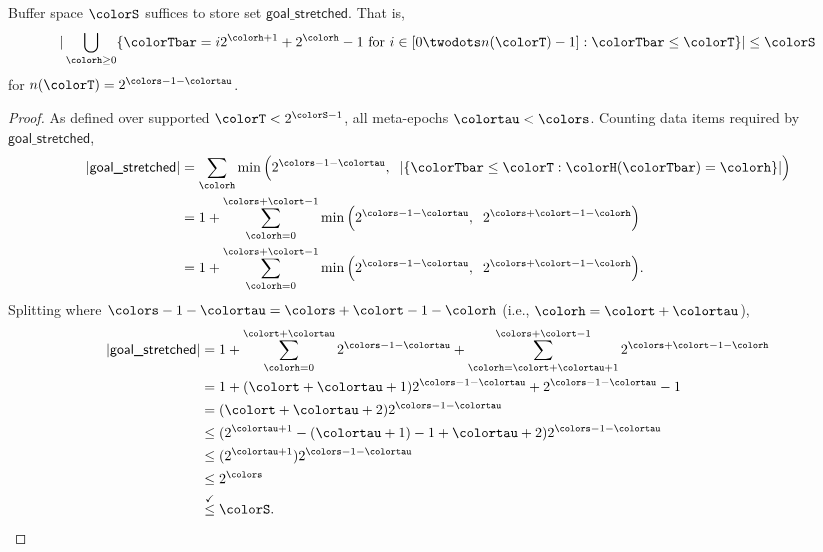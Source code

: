 \begin{lemma}
\label{thm:stretched-first-n-space}

Buffer space $\colorS$ suffices to store set $\textsf{goal\_stretched}$.
That is,
\begin{align*}
|\bigcup_{\colorh \geq 0}
\{ \colorTbar = i2^{\colorh + 1} + 2^{\colorh} - 1 \text{ for } i \in [0 \twodots n(\colorT) - 1] : \colorTbar \leq \colorT \}| \leq \colorS
\end{align*}
for $n(\colorT) = 2^{\colors - 1 - \colortau}$.
\end{lemma}
\begin{proof}
As defined over supported $\colorT < 2^{\colorS - 1}$, all meta-epochs $\colortau<\colors$.
Counting data items required by $\textsf{goal\_stretched}$,
\begin{align*}
|\textsf{goal\_stretched}|
&=
\sum_{\colorh} \min\Big(2^{\colors - 1 - \colortau},\;\; |\{ \colorTbar \leq \colorT : \colorH(\colorTbar) = \colorh \}|\Big)\\
&=
1 + \sum_{\colorh=0}^{\colors + \colort - 1} \min\Big(2^{\colors - 1 - \colortau},\;\; 2^{\colors + \colort - 1 - \colorh}\Big)\\
&=
1 + \sum_{\colorh=0}^{\colors + \colort - 1} \min\Big(2^{\colors - 1 - \colortau},\;\; 2^{\colors + \colort - 1 - \colorh}\Big).
\end{align*}
Splitting where $\colors - 1 - \colortau = \colors + \colort - 1 - \colorh$ (i.e., $\colorh = \colort + \colortau$),
\begin{align*}
|\textsf{goal\_stretched}|
&=
1 + \sum_{\colorh=0}^{\colort + \colortau} 2^{\colors - 1 - \colortau} + \sum_{\colorh=\colort + \colortau + 1}^{\colors + \colort - 1} 2^{\colors + \colort - 1 - \colorh}\\
&=
1 + (\colort + \colortau + 1) 2^{\colors - 1 - \colortau} + 2^{\colors - 1 - \colortau} - 1\\
&=
(\colort + \colortau + 2) 2^{\colors - 1 - \colortau}\\
&\leq
(2^{\colortau + 1} - (\colortau + 1) - 1 + \colortau + 2) 2^{\colors - 1 - \colortau}\\
&\leq
(2^{\colortau + 1}) 2^{\colors - 1 - \colortau}\\
&\leq
2^{\colors}\\
&\stackrel{\checkmark}\leq
\colorS.
\end{align*}





\end{proof}
